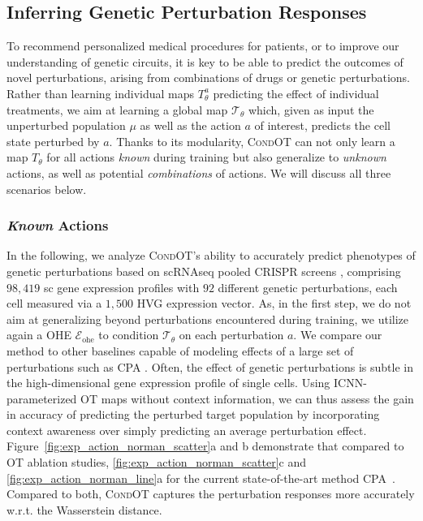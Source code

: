 \subsection{Inferring Genetic Perturbation Responses}
\label{sec:eval_action}

 To recommend personalized medical procedures for patients, or to improve our understanding of genetic circuits, it is key to be able to predict the outcomes of novel perturbations, arising from combinations of drugs or genetic perturbations. 
Rather than learning individual maps $T_\theta^a$ predicting the effect of individual treatments, we aim at learning a global map  $\mathcal{T}_\theta$ which, given as input the unperturbed population $\mu$ as well as the action $a$ of interest, predicts the cell state perturbed by $a$.
Thanks to its modularity, \textsc{CondOT} can not only learn a map $T_\theta$ for all actions \emph{known} during training but also generalize to \emph{unknown} actions, as well as potential \emph{combinations} of actions. We will discuss all three scenarios below.

\subsubsection{\textit{Known} Actions}
\label{sec:eval_action_known}

 In the following, we analyze \textsc{CondOT}'s ability to accurately predict phenotypes of genetic perturbations based on \acrshort{sc}\acrshort{RNAseq} pooled \acrshort{CRISPR} screens \citep{norman2019exploring, dixit2016perturb}, comprising $98,419$ \acrlong{sc} gene expression profiles with $92$ different genetic perturbations, each cell measured via a $1,500$ \acrlong{HVG} expression vector.
As, in the first step, we do not aim at generalizing beyond perturbations encountered during training, we utilize again a \acrshort{OHE} $\mathcal{E}_\text{ohe}$ to condition $\mathcal{T}_\theta$ on each perturbation $a$.
We compare our method to other baselines capable of modeling effects of a large set of perturbations such as \textsc{CPA} \citep{lotfollahi2021compositional}.
Often, the effect of genetic perturbations is subtle in the high-dimensional gene expression profile of single cells. Using \acrshort{ICNN}-parameterized \acrshort{OT} maps without context information, we can thus assess the gain in accuracy of predicting the perturbed target population by incorporating context awareness over simply predicting an average perturbation effect. 
Figure~\ref{fig:exp_action_norman_scatter}a and b demonstrate that compared to \acrshort{OT} ablation studies, \cref{fig:exp_action_norman_scatter}c and \cref{fig:exp_action_norman_line}a for the current state-of-the-art method \textsc{CPA}~\citep{lotfollahi2021compositional}. Compared to both, \textsc{CondOT} captures the perturbation responses more accurately w.r.t. the Wasserstein distance.

